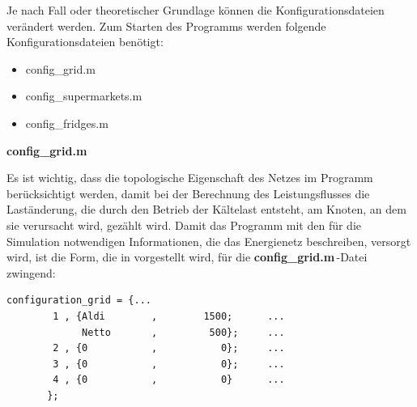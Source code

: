 Je nach Fall oder theoretischer Grundlage können die Konfigurationsdateien
verändert werden.  Zum Starten des Programms werden
folgende Konfigurationsdateien benötigt:

\begin{itemize}
	\item config\_grid.m
	\item config\_supermarkets.m
	\item config\_fridges.m
\end{itemize}
\vspace{3mm}
\noindent\textbf{config\_grid.m}
\vspace{3mm}

Es ist wichtig, dass die topologische Eigenschaft des Netzes im Programm
berücksichtigt werden, damit bei der Berechnung des Leistungsflusses die
Laständerung, die durch den Betrieb der Kältelast entsteht, am Knoten, an dem
sie verursacht wird, gezählt wird. Damit das Programm mit
den für die Simulation notwendigen Informationen, die das Energienetz
beschreiben, versorgt wird, ist die Form, die in  vorgestellt
wird, für die \textbf{config\_grid.m$\,$}-Datei zwingend:

\begin{lstlisting}[float=h,caption={config\_grid.m},label={cgrid}]
%%	Bus,  Supermarkets,	  Number of Supermarkets
configuration_grid = {...
        1 , {Aldi	     ,	      1500;	     ...
             Netto	     ,	       500};	 ...
        2 , {0	         ,           0};	 ...
        3 , {0	         ,           0};	 ...
        4 , {0	         ,           0}	     ...
       };
\end{lstlisting}

